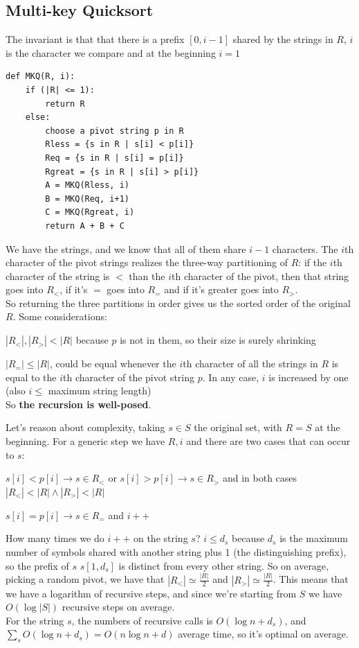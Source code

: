 \documentclass[10pt]{report}
\begin{document}
\subsection{Multi-key Quicksort}
The invariant is that that there is a prefix $[0, i-1]$ shared by the strings in $R$, $i$ is the character we compare and at the beginning $i=1$
\begin{lstlisting}[style=myPython]
def MKQ(R, i):
	if (|R| <= 1):
		return R
	else:
		choose a pivot string p in R
		Rless = {s in R | s[i] < p[i]}
		Req = {s in R | s[i] = p[i]}
		Rgreat = {s in R | s[i] > p[i]}
		A = MKQ(Rless, i)
		B = MKQ(Req, i+1)
		C = MKQ(Rgreat, i)
		return A + B + C
\end{lstlisting}
We have the strings, and we know that all of them share $i-1$ characters. The $i$th character of the pivot strings realizes the three-way partitioning of $R$: if the $i$th character of the string is $<$ than the $i$th character of the pivot, then that string goes into $R_<$, if it's $=$ goes into $R_=$ and if it's greater goes into $R_>$.\\
So returning the three partitions in order gives us the sorted order of the original $R$. Some considerations:
\begin{list}{}{}
	\item $|R_<|,|R_>|<|R|$ because $p$ is not in them, so their size is surely shrinking
	\item $|R_=|\leq |R|$, could be equal whenever the $i$th character of all the strings in $R$ is equal to the $i$th character of the pivot string $p$. In any case, $i$ is increased by one (also $i\leq$ maximum string length)\\
	So \textbf{the recursion is well-posed}.
\end{list}
Let's reason about complexity, taking $s\in S$ the original set, with $R=S$ at the beginning. For a generic step we have $R, i$ and there are two cases that can occur to $s$:
\begin{list}{}{}
	\item $s[i]<p[i]\rightarrow s\in R_<$ or $s[i]>p[i]\rightarrow s\in R_>$ and in both cases $|R_<|<|R|\wedge|R_>|<|R|$
	\item $s[i]=p[i]\rightarrow s\in R_=$ and $i++$
\end{list}
How many times we do $i++$ on the string $s$? $i\leq d_s$ because $d_s$ is the maximum number of symbols shared with another string plus 1 (the distinguishing prefix), so the prefix of $s$ $s[1,d_s]$ is distinct from every other string. So on average, picking a random pivot, we have that $|R_<|\simeq\frac{|R|}{2}$ and $|R_>|\simeq\frac{|R|}{2}$. This means that we have a logarithm of recursive steps, and since we're starting from $S$ we have $O(\log |S|)$ recursive steps on average.\\
For the string $s$, the numbers of recursive calls is $O(\log n + d_s)$, and $\sum_s O(\log n + d_s) = O(n\log n + d)$ average time, so it's optimal on average.
\end{document}
